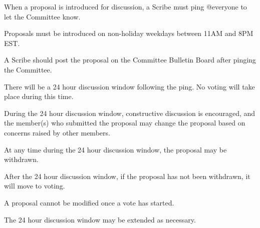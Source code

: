 \begin{deepEnumerate}
    \item When a proposal is introduced for discussion, a Scribe must ping @everyone to let the Committee know.
    \begin{deepEnumerate}
        \item Proposals must be introduced on non-holiday weekdays between 11AM and 8PM EST.
        \item A Scribe should post the proposal on the Committee Bulletin Board after pinging the Committee.
    \end{deepEnumerate}
    \item There will be a 24 hour discussion window following the ping. No voting will take place during this time.
    \begin{deepEnumerate}
        \item During the 24 hour discussion window, constructive discussion is encouraged, and the member(s) who submitted the proposal may change the proposal
        based on concerns raised by other members.
        \item At any time during the 24 hour discussion window, the proposal may be withdrawn.
    \end{deepEnumerate}
    \item After the 24 hour discussion window, if the proposal has not been withdrawn, it will move to voting.
    \begin{deepEnumerate}
        \item A proposal cannot be modified once a vote has started.
        \item The 24 hour discussion window may be extended as necessary.
    \end{deepEnumerate}
\end{deepEnumerate}

